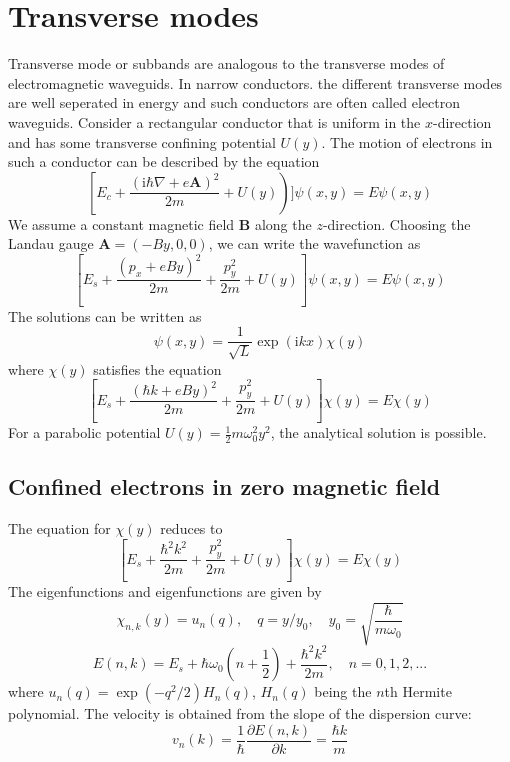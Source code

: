 \documentclass[11pt,a4paper]{book}
\theoremstyle{plain}
\theoremstyle{definition}
\theoremstyle{remark}
\newcommand{\ii}{\mathrm{i}}                      %
\renewcommand{\vec}[1]{\boldsymbol{#1}}
\begin{document}
\section{Transverse modes}
Transverse mode or subbands are analogous to the transverse modes of electromagnetic waveguids. In narrow conductors. the different transverse modes are well seperated in energy and such conductors are often called electron waveguids. Consider a rectangular conductor that is uniform in the $x$-direction and has some transverse confining potential $U(y)$. The motion of electrons in such a conductor can be described by the equation
\begin{equation}
    \left[E_c + \frac{(\ii \hbar \nabla + e \vec{A})^2}{2 m} + U(y)\right)] \psi(x,y) = E \psi(x,y)
\end{equation}
We assume a constant magnetic field $\vec{B}$ along the $z$-direction. Choosing the Landau gauge $\vec{A} = (-B y, 0, 0)$, we can write the wavefunction as
\begin{equation}
    \left[E_s + \frac{(p_x+eBy)^2}{2 m} + \frac{p_y^2}{2 m} + U(y)\right] \psi(x,y) = E \psi(x,y)
\end{equation}
The solutions can be written as
\begin{equation}
    \psi(x,y) = \frac{1}{\sqrt{L}}\exp(\ii k x) \chi(y)
\end{equation}
where $\chi(y)$ satisfies the equation
\begin{equation}
    \left[E_s + \frac{(\hbar k + e B y)^2}{2 m} + \frac{p_y^2}{2 m} + U(y)\right] \chi(y) = E \chi(y)
\end{equation}
For a parabolic potential $U(y) = \frac{1}{2} m \omega_0^2 y^2$, the analytical solution is possible.
\subsection{Confined electrons in zero magnetic field}
The equation for $\chi(y)$ reduces to
\begin{equation}
    \left[E_s + \frac{\hbar^2 k^2}{2 m} + \frac{p_y^2}{2 m} + U(y)\right] \chi(y) = E \chi(y)
\end{equation}
The eigenfunctions and eigenfunctions are given by
\begin{equation}
        \chi_{n,k}(y) = u_n(q) , \quad q = y/y_0, \quad y_0 = \sqrt{\frac{\hbar}{m \omega_0}} 
\end{equation}
\begin{equation}
    E(n,k) = E_s + \hbar \omega_0 \left(n + \frac{1}{2}\right) + \frac{\hbar^2 k^2}{2 m}, \quad n=0,1,2,...
\end{equation}
where $u_n(q) = \exp(-q^2/2)H_n(q)$, $H_n(q)$ being the $n$th Hermite polynomial. The velocity is obtained from the slope of the dispersion curve:
\begin{equation}
    v_n(k) = \frac{1}{\hbar} \frac{\partial E(n,k)}{\partial k} = \frac{\hbar k}{m}
\end{equation}
\end{document}
